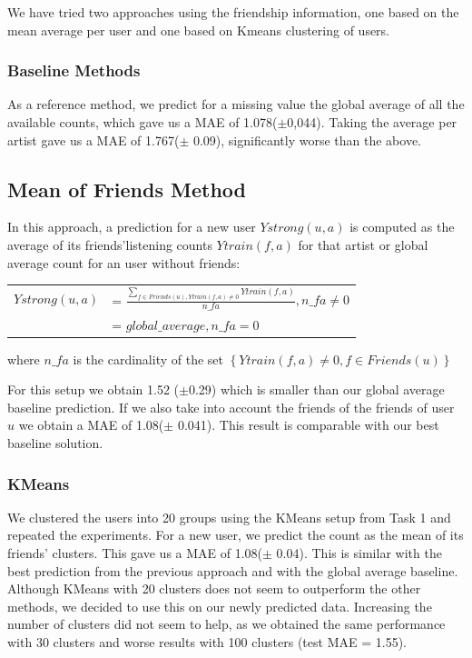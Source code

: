 We have tried two approaches using the friendship information, one based on the mean average per user and one based on Kmeans clustering of users.

\subsubsection{Baseline Methods}
As a reference method, we predict for a missing value the global average of all the available counts, which gave us a MAE of 1.078($\pm$0,044). Taking the average per artist gave us a MAE of 1.767($\pm$  0.09), significantly worse than the above.

\subsection{Mean of Friends Method}
 In this approach, a prediction for a new user $Ystrong(u,a)$ is computed as the average of its friends'listening counts $Ytrain(f,a)$ for that artist or global average count for an user without friends:

\begin{table}[h]
  \centering
  \begin{tabular}{ c  l }
  $Ystrong(u,a) $&= $\frac{\sum_{f\in Friends(u), Ytrain(f,a)\neq0}{Ytrain(f,a)}}{n\_fa}, n\_fa \neq 0$ \\ 
                          &= $global\_average, n\_fa = 0$ \\ 
  \end{tabular}
\end{table}
where $n\_fa$ is the cardinality of the set $\left\{ Ytrain(f,a)\neq0, f\in Friends(u)\right\}$

For this setup  we obtain  1.52 ($\pm$0.29) which is smaller than our global average baseline prediction.
If we also take into account the friends of the friends of user $u$ we obtain  a MAE of 1.08($\pm$ 0.041). This result is comparable with our best baseline solution.

\subsubsection{KMeans}
We clustered the users into 20 groups using the KMeans setup from Task 1
and repeated the experiments. For a new user,  we predict the count as the mean of its friends' clusters. This gave us a MAE of
1.08($\pm$ 0.04). This is similar with the best prediction from the previous approach and with the  global average baseline. Although KMeans with 20 clusters does not seem to outperform the other methods, we decided to use this on our newly predicted data.
Increasing the number of clusters did not seem to help, as we obtained the same performance with 30 clusters and worse results with 100 clusters (test MAE = 1.55). 
 
